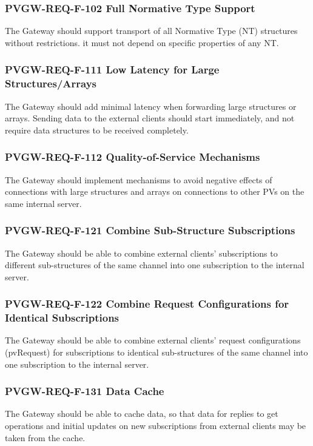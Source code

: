 \documentclass[11pt
  , a4paper
  , article
  , oneside
]{memoir}
\begin{document}
\subsubsection{PVGW-REQ-F-102 Full Normative Type Support}
The Gateway should support transport of all Normative Type (NT) structures without restrictions. it must not depend on specific properties of any NT.

\subsubsection{PVGW-REQ-F-111 Low Latency for Large Structures/Arrays}
The Gateway should add minimal latency when forwarding large structures or arrays. Sending data to the external clients should start immediately, and not require data structures to be received completely.

\subsubsection{PVGW-REQ-F-112 Quality-of-Service Mechanisms}
The Gateway should implement mechanisms to avoid negative effects of connections with large structures and arrays on connections to other PVs on the same internal server.

\subsubsection{PVGW-REQ-F-121 Combine Sub-Structure Subscriptions}
The Gateway should be able to combine external clients' subscriptions to different sub-structures of the same channel into one subscription to the internal server.

\subsubsection{PVGW-REQ-F-122 Combine Request Configurations for Identical Subscriptions}
The Gateway should be able to combine external clients' request configurations (pvRequest) for subscriptions to identical sub-structures of the same channel into one subscription to the internal server.

\subsubsection{PVGW-REQ-F-131 Data Cache}
The Gateway should be able to cache data, so that data for replies to get operations and initial updates on new subscriptions from external clients may be taken from the cache.
\end{document}
